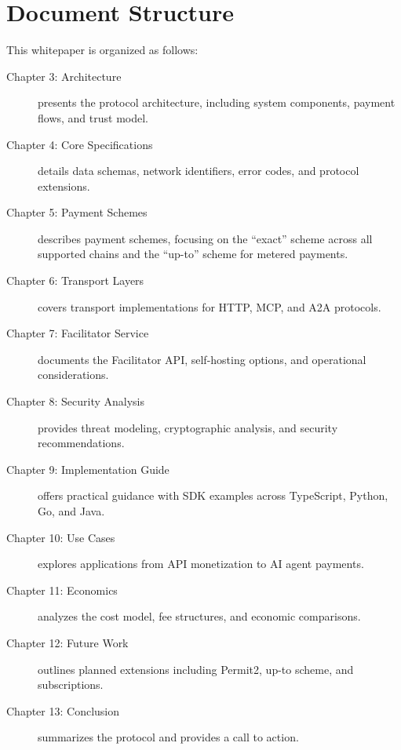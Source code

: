 \section{Document Structure}
\label{sec:structure}

This whitepaper is organized as follows:

\begin{description}
    \item[Chapter 3: Architecture] presents the protocol architecture, including system components, payment flows, and trust model.

    \item[Chapter 4: Core Specifications] details data schemas, network identifiers, error codes, and protocol extensions.

    \item[Chapter 5: Payment Schemes] describes payment schemes, focusing on the ``exact'' scheme across all supported chains and the ``up-to'' scheme for metered payments.

    \item[Chapter 6: Transport Layers] covers transport implementations for HTTP, MCP, and A2A protocols.

    \item[Chapter 7: Facilitator Service] documents the Facilitator API, self-hosting options, and operational considerations.

    \item[Chapter 8: Security Analysis] provides threat modeling, cryptographic analysis, and security recommendations.

    \item[Chapter 9: Implementation Guide] offers practical guidance with SDK examples across TypeScript, Python, Go, and Java.

    \item[Chapter 10: Use Cases] explores applications from API monetization to AI agent payments.

    \item[Chapter 11: Economics] analyzes the cost model, fee structures, and economic comparisons.

    \item[Chapter 12: Future Work] outlines planned extensions including Permit2, up-to scheme, and subscriptions.

    \item[Chapter 13: Conclusion] summarizes the protocol and provides a call to action.
\end{description}
